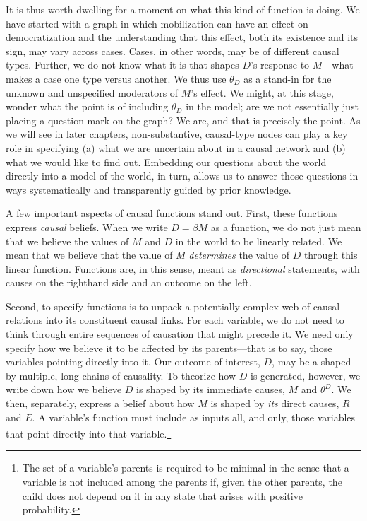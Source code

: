\documentclass[
  12pt,
]{book}
\begin{document}
It is thus worth dwelling for a moment on what this kind of function is doing. We have started with a graph in which mobilization can have an effect on democratization and the understanding that this effect, both its existence and its sign, may vary across cases. Cases, in other words, may be of different causal types. Further, we do not know what it is that shapes \(D\)'s response to \(M\)---what makes a case one type versus another. We thus use \(\theta_D\) as a stand-in for the unknown and unspecified moderators of \(M\)'s effect. We might, at this stage, wonder what the point is of including \(\theta_D\) in the model; are we not essentially just placing a question mark on the graph? We are, and that is precisely the point. As we will see in later chapters, non-substantive, causal-type nodes can play a key role in specifying (a) what we are uncertain about in a causal network and (b) what we would like to find out. Embedding our questions about the world directly into a model of the world, in turn, allows us to answer those questions in ways systematically and transparently guided by prior knowledge.

A few important aspects of causal functions stand out. First, these functions express \emph{causal} beliefs. When we write \(D=\beta M\) as a function, we do not just mean that we believe the values of \(M\) and \(D\) in the world to be linearly related. We mean that we believe that the value of \(M\) \emph{determines} the value of \(D\) through this linear function. Functions are, in this sense, meant as \emph{directional} statements, with causes on the righthand side and an outcome on the left.

Second, to specify functions is to unpack a potentially complex web of causal relations into its constituent causal links. For each variable, we do not need to think through entire sequences of causation that might precede it. We need only specify how we believe it to be affected by its parents---that is to say, those variables pointing directly into it. Our outcome of interest, \(D\), may be a shaped by multiple, long chains of causality. To theorize how \(D\) is generated, however, we write down how we believe \(D\) is shaped by its immediate causes, \(M\) and \(\theta^D\). We then, separately, express a belief about how \(M\) is shaped by \emph{its} direct causes, \(R\) and \(E\). A variable's function must include as inputs all, and only, those variables that point directly into that variable.\footnote{The set of a variable's parents is required to be minimal in the sense that a variable is not included among the parents if, given the other parents, the child does not depend on it in any state that arises with positive probability.}
\end{document}
